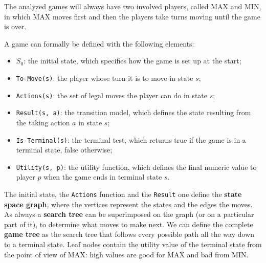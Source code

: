 \documentclass{article}
\begin{document}
The analyzed games will always have two involved players, called MAX and MIN, in which MAX moves first and then the players take turns moving until the game is over. 

A game can formally be defined with the following elements:
\begin{itemize}
    \item \(S_0\): the initial state, which specifies how the game is set up at the start;
    \item \lstinline{To-Move(s)}: the player whose turn it is to move in state \(s\);
    \item \lstinline{Actions(s)}: the set of legal moves the player can do in state \(s\);
    \item \lstinline{Result(s, a)}: the transition model, which defines the state resulting from the taking action \(a\) in state \(s\);
    \item \lstinline{Is-Terminal(s)}: the terminal test, which returns true if the game is in a terminal state, false otherwise;
    \item \lstinline{Utility(s, p)}: the utility function, which defines the final numeric value to player \(p\) when the game ends in terminal state \(s\).    
\end{itemize}

The initial state, the \lstinline{Actions} function and the \lstinline{Result} one define the \textbf{state space graph}, where the vertices represent the states and the edges the moves. As always a \textbf{search tree} can be superimposed on the graph (or on a particular part of it), to determine what moves to make next. We can define the complete \textbf{game tree} as the search tree that follows every possible path all the way down to a terminal state.
Leaf nodes contain the utility value of the terminal state from the point of view of MAX: high values are good for MAX and bad from MIN.
\end{document}
